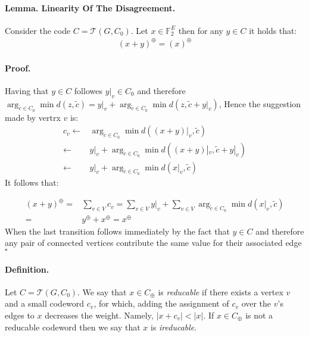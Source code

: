 \documentclass[sigplan,screen]{acmart}
\newcommand{ \Tann } {  \mathcal{T}\left( G, C_0 \right) }
\begin{document}
\begin{multicols*}{2}
  \paragraph{Lemma. Linearity Of The Disagreement.} Consider the code $C = \Tann$. Let $ x \in \mathbb{F}_{2}^{E}$ then for any $ y \in C$ it holds that: 
  \begin{equation*}
    \begin{split}
      \left( x + y  \right)^{\oplus} = \left( x  \right)^{\oplus} 
    \end{split}
  \end{equation*}
  \paragraph{Proof.} Having that $y \in C$ followes $y|_v \in C_{0}$ and therefore $\arg_{ \tilde{c} \in C_{0}} \min{ d( z  , \tilde{c} ) } = y|_{v} + \arg_{ \tilde{c} \in C_{0}} \min{ d( z, \tilde{c} + y|_{v} ) } $, Hence the suggestion made by vertrx $v$ is: 
  \begin{equation*}
    \begin{split}
      c_{v}\leftarrow &  \arg_{ \tilde{c} \in C_{0}} \min{ d( (x+y)|_{v}  , \tilde{c} ) } \\
      \leftarrow &  y|_{v} +  \arg_{ \tilde{c} \in C_{0}} \min{ d( (x+y)|_{v}  , \tilde{c} + y|_{v} ) } \\
      \leftarrow &  y|_{v} +  \arg_{ \tilde{c} \in C_{0}} \min{ d( x|_{v} , \tilde{c} ) } 
    \end{split}
  \end{equation*}
  It follows that: 

  \begin{equation*}
    \begin{split}
      \left( x + y \right)^{\oplus} =& \sum_{v\in V}{c_{v}} = \sum_{v \in V}{y|_{v}} + \sum_{v\in V}{ \arg_{ \tilde{c} \in C_{0}} \min{ d( x|_{v} , \tilde{c} ) } } \\ 
      =& y^{\oplus} + x^{\oplus} = x^{\oplus}
    \end{split}
  \end{equation*}
  When the last transition follows immediately by the fact that $y \in C$ and therefore any pair of connected vertices contribute the same value for their associated edge $\square$

  \paragraph{Definition.} Let $C = \Tann$. We say that $x \in C_{\oplus}$ is \textit{reducable} if there exists a vertex $v$ and a small codeword $c_v$, for which, adding the assignment of $c_v$ over the $v$'s edges to $x$ decreases the weight. Namely, $|x + c_{v}| < |x|$. If $x \in C_{\oplus}$ is not a reducable codeword then we say that $x$ is \textit{ireducable}.   


\end{multicols*}
\end{document}

